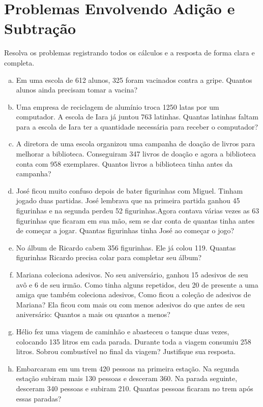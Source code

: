 \section{Problemas Envolvendo Adição e Subtração}

	\item Resolva os problemas registrando todos os cálculos e a resposta de forma clara e completa.
	\begin{enumerate}[a)]
		\item Em uma escola de 612 alunos, 325 foram vacinados contra a gripe. Quantos alunos ainda precisam tomar a vacina? 
		\item Uma empresa de reciclagem de alumínio troca 1250 latas por um computador. A escola de Iara já juntou 763 latinhas. Quantas latinhas faltam para a escola de Iara ter a quantidade necessária para receber o computador?
		\item A diretora de uma escola organizou uma campanha de doação de livros para melhorar a biblioteca. Conseguiram 347 livros de doação e agora a biblioteca conta com 958 exemplares. Quantos livros a biblioteca tinha antes da campanha?
		\item José ficou muito confuso depois de bater figurinhas com Miguel. Tinham jogado duas partidas. José lembrava que na primeira partida ganhou 45 figurinhas e na segunda perdeu 52 figurinhas.Agora contava várias vezes as 63 figurinhas que ficaram em sua mão, sem se dar conta de quantas tinha antes de começar a jogar. Quantas figurinhas tinha José ao começar o jogo?
		\item No álbum de Ricardo cabem 356 figurinhas. Ele já colou 119. Quantas figurinhas Ricardo precisa colar para completar seu álbum?
		\item Mariana coleciona adesivos. No seu aniversário, ganhou 15 adesivos de seu avô e 6 de seu irmão. Como tinha alguns repetidos, deu 20 de presente a uma amiga que também coleciona adesivos, Como ficou a coleção de adesivos de Mariana? Ela ficou com mais ou com menos adesivos do que antes de seu aniversário: Quantos a mais ou quantos a menos?
		\item Hélio fez uma viagem de caminhão e abasteceu o tanque duas vezes, colocando 135 litros em cada parada. Durante toda a viagem consumiu 258 litros. Sobrou combustível no final da viagem? Justifique sua resposta.
		\item Embarcaram em um trem 420 pessoas na primeira estação. Na segunda estação subiram mais 130 pessoas e desceram 360. Na parada seguinte, desceram 340 pessoas e subiram 210. Quantas pessoas ficaram no trem após essas paradas?

\end{enumerate}
